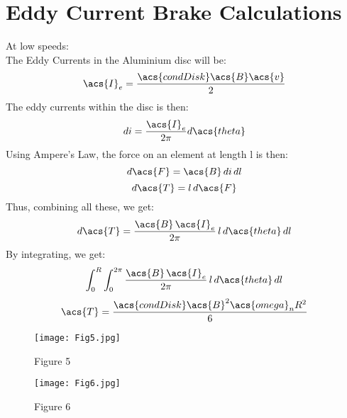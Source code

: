 \newpage
{} 
\setcounter{page}{1}
\appendix
\renewcommand\thechapter{A}

\chapter{Eddy Current Brake Calculations}



\newpage

At low speeds:\\
The Eddy Currents in the Aluminium disc will be:
\[
\acs{I}_e = \frac{\acs{condDisk} \acs{B} \acs{v}}{2}
\]
The eddy currents within the disc is then:
\[
di = \frac{\acs{I}_e}{2 \pi} d\acs{theta}
\]
Using Ampere's Law, the force on an element at length l is then:
\[
d\acs{F} = \acs{B} \, di \, dl
\]
\[
d\acs{T} = l \, d\acs{F}
\]
Thus, combining all these, we get:
\[
d\acs{T} = \frac{\acs{B} \, \acs{I}_e}{2 \pi} \, l \, d\acs{theta} \, dl
\]
By integrating, we get:
\[
\int_{0}^{R} \int_{0}^{2 \pi} \frac{\acs{B} \, \acs{I}_e}{2 \pi} \, l \, d\acs{theta} \, dl
\]
\[
\acs{T} = \frac{\acs{condDisk}\acs{B}^2\acs{omega}_n R^2}{6}
\]

\begin{figure}[H]
	\begin{center}
		\texttt{[image: Fig5.jpg]}
		\caption{Figure 5}
		\label{fig:5}
	\end{center}
\end{figure}

\begin{figure}[H]
	\begin{center}
		\texttt{[image: Fig6.jpg]}
		\caption{Figure 6}
		\label{fig:6}
	\end{center}
\end{figure}